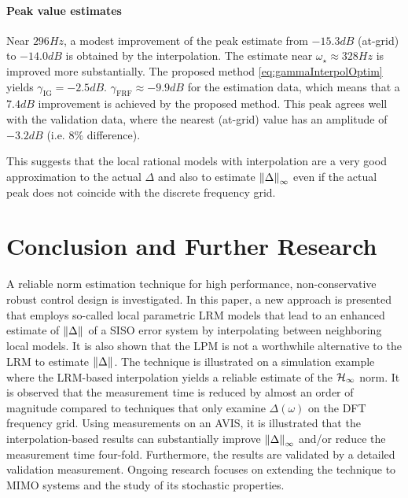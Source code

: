 \paragraph*{Peak value estimates}
\label{sec:avis-peak-value}
Near $296\unit{Hz}$, a modest improvement of the peak estimate from $-15.3 \unit{dB}$ (at-grid) to $-14.0 \unit{dB}$ is obtained by the interpolation.
The estimate near $\omega_{\star} \approx 328\unit{Hz}$ is improved more substantially.
The proposed method \eqref{eq:gammaInterpolOptim} yields $\gamma_{\mathrm{IG}}=-2.5\unit{dB}$.
$\gamma_{\mathrm{FRF}}\approx -9.9\unit{dB}$ for the estimation data, which means that a $7.4\unit{dB}$ improvement is achieved by the proposed method.
This peak agrees well with the validation data, where the nearest (at-grid) value has an amplitude of $-3.2\unit{dB}$ (i.e. $8\%$ difference).

This suggests that the local rational models with interpolation are a very good approximation to the actual $\Delta$ and also to estimate $\left\| \Delta \right\|_{\infty}$ even if the actual peak does not coincide with the discrete frequency grid.

\section{Conclusion and Further Research}
\label{sec:conclusion}
A reliable \Hinf{} norm estimation technique for high performance, non-conservative robust control design is investigated.
In this paper, a new approach is presented that employs so-called local parametric \gls{LRM} models that lead to an enhanced estimate of $\left\| \Delta \right\|_{}$ of a \gls{SISO} error system by interpolating between neighboring local models.
It is also shown that the \gls{LPM} is not a worthwhile alternative to the \gls{LRM} to estimate $\left\| \Delta \right\|_{}$.
The technique is illustrated on a simulation example where the \gls{LRM}-based interpolation yields a reliable estimate of the $\mathcal{H}_{\infty}{}$ norm.
It is observed that the measurement time is reduced by almost an order of magnitude compared to techniques that only examine $\Delta(\omega)$ on the \gls{DFT} frequency grid.
Using measurements on an \gls{AVIS}, it is illustrated that the interpolation-based results can substantially improve $\left\| \Delta \right\|_{\infty}$ and/or reduce the measurement time four-fold.
Furthermore, the results are validated by a detailed validation measurement.
Ongoing research focuses on extending the technique to \gls{MIMO} systems and the study of its stochastic properties.
